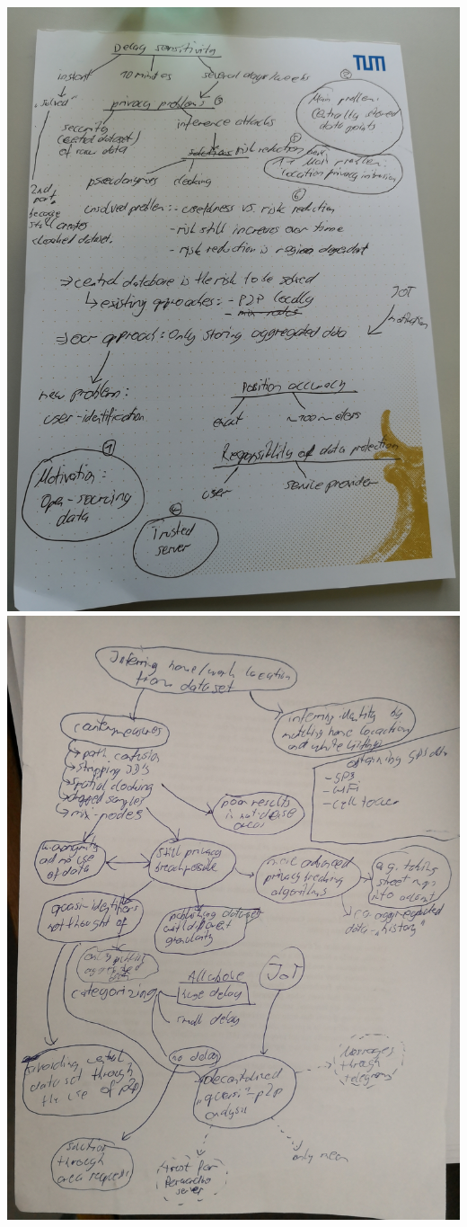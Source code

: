 \includegraphics[width=\textwidth]{data/research-overview.jpg}
\includegraphics[width=\textwidth]{data/research-overview-2.jpg}
